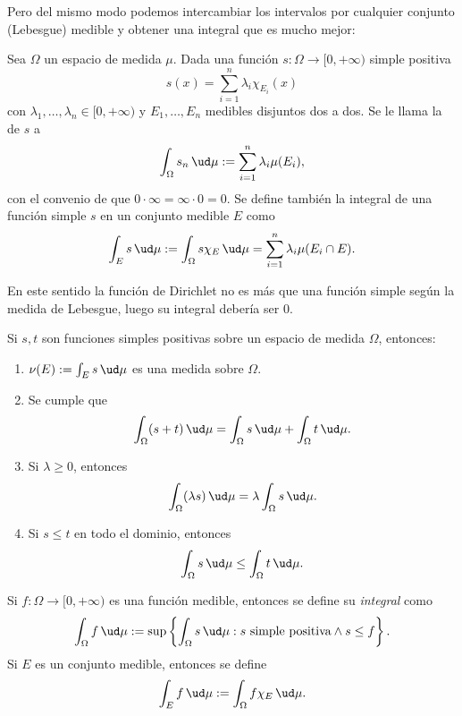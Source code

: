 Pero del mismo modo podemos intercambiar los intervalos por cualquier conjunto (Lebesgue) medible y obtener una integral que es mucho mejor:
\begin{mydefi}
	Sea $\Omega$ un espacio de medida $\mu$.
	Dada una función $s\colon \Omega \to [0,+\infty)$ simple positiva
	$$ s(x) = \sum_{i=1}^n \lambda_i\chi_{E_i}(x) $$
	con $\lambda_1,\dots,\lambda_n \in [0, +\infty)$ y $E_1,\dots,E_n$ medibles disjuntos dos a dos.
	Se le llama la  de $s$ a
	$$ \int_\Omega s_n \,\ud\mu := \sum_{i=1}^n \lambda_i\mu(E_i), $$
	con el convenio de que $0\cdot\infty = \infty\cdot 0 = 0$.
	Se define también la integral de una función simple $s$ en un conjunto medible $E$ como
	$$ \int_E s\,\ud\mu := \int_\Omega s\chi_E\,\ud\mu = \sum_{i=1}^n \lambda_i\mu(E_i\cap E). $$
\end{mydefi}

En este sentido la función de Dirichlet no es más que una función simple según la medida de Lebesgue, luego su integral debería ser 0.

\begin{prop}
	Si $s,t$ son funciones simples positivas sobre un espacio de medida $\Omega$, entonces:
	\begin{enumerate}
		\item $\nu(E) := \int_E s\,\ud\mu$ es una medida sobre $\Omega$.
		\item Se cumple que
			$$ \int_\Omega (s+t)\,\ud\mu = \int_\Omega s\,\ud\mu + \int_\Omega t\,\ud\mu. $$
		\item Si $\lambda \ge 0$, entonces
			$$ \int_\Omega (\lambda s)\,\ud\mu = \lambda \int_\Omega s\,\ud\mu. $$
		\item Si $s \le t$ en todo el dominio, entonces
			$$ \int_\Omega s\,\ud\mu \le \int_\Omega t\,\ud\mu. $$
	\end{enumerate}
\end{prop}

\begin{mydefi}
	Si $f\colon \Omega \to [0,+\infty)$ es una función medible, entonces se define su \textit{integral} como
	$$ \int_\Omega f\,\ud\mu := \sup \left\{\int_\Omega s\,\ud\mu : s\text{ simple positiva}\wedge s\le f\right\}. $$
	Si $E$ es un conjunto medible, entonces se define
	$$ \int_E f\,\ud\mu := \int_\Omega f\chi_E\,\ud\mu. $$
\end{mydefi}

